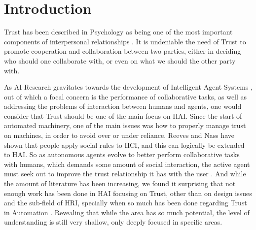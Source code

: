 \section{Introduction}
\label{sec:Introduction}

Trust has been described in Psychology as being one of the most important components of interpersonal relationships \cite{Simpson2007}. It is undeniable the need of Trust to promote cooperation and collaboration between two parties, either in deciding who should one collaborate with, or even on what we should the other party with. 


As \ac{AI} Research gravitates towards the development of Intelligent Agent Systems \cite{Russell2009a}, out of which a focal concern is the performance of collaborative tasks\cite{Grosz1996, Allen2002, Allen2007}, as well as addressing the problems of interaction between humans and agents\cite{Bradshaw2011}, one would consider that Trust should be one of the main focus on \ac{HAI}. Since the start of automated machinery, one of the main issues was how to properly manage trust on machines, in order to avoid over or under reliance\cite{Lee2004}. Reeves and Nass have shown that people apply social rules to \ac{HCI}, and this can logically be extended to \ac{HAI}\cite{Reeves1998a}. So as autonomous agents evolve to better perform collaborative tasks with humans, which demands some amount of social interaction, the active agent must seek out to improve the trust relationship it has with the user \cite{Lashkari1994}. And while the amount of literature has been increasing, we found it surprising that not enough work has been done in \ac{HAI} focusing on Trust, other than on design issues\cite{Bickmore2005} and the sub-field of \ac{HRI}\cite{Goodrich2007, VandenBrule2014}, specially when so much has been done regarding Trust in Automation \cite{Lee1992, Jones1997, Lee2004}. Revealing that while the area has so much potential, the level of understanding is still very shallow, only deeply focused in specific areas.

